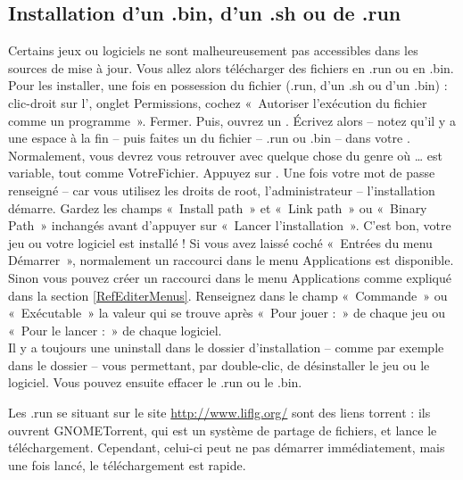 \subsection{Installation d'un .bin, d'un .sh ou de .run}
Certains jeux ou logiciels ne sont malheureusement pas accessibles dans les sources de mise à jour. Vous allez alors télécharger des fichiers en .run ou en .bin. Pour les installer, une fois en possession du fichier (.run, d'un .sh ou d'un .bin) : clic-droit sur l', onglet Permissions, cochez  «~Autoriser l'exécution du fichier comme un programme~». Fermer. Puis, ouvrez un . Écrivez alors  -- notez qu'il y a une espace à la fin -- puis faites un  du fichier -- .run ou .bin -- dans votre . Normalement, vous devrez vous retrouver avec quelque chose du genre  où \ldots{} est variable, tout comme VotreFichier. Appuyez sur . Une fois votre mot de passe renseigné -- car vous utilisez les droits de root, l'administrateur -- l'installation démarre. Gardez les champs «~Install path~» et «~Link path~» ou «~Binary Path~» inchangés avant d'appuyer sur «~Lancer l'installation~». C'est bon, votre jeu ou votre logiciel est installé ! Si vous avez laissé coché «~Entrées du menu Démarrer~», normalement un raccourci dans le menu Applications est disponible. Sinon vous pouvez créer un raccourci dans le menu Applications comme expliqué dans la section \ref{RefEditerMenus}. Renseignez dans le champ «~Commande~» ou «~Exécutable~» la valeur qui se trouve après «~Pour jouer :~» de chaque jeu ou «~Pour le lancer :~» de chaque logiciel.\\
Il y a toujours une  uninstall dans le dossier d'installation -- comme par exemple dans le dossier  -- vous permettant, par double-clic, de désinstaller le jeu ou le logiciel. Vous pouvez ensuite effacer le .run ou le .bin.\par
\begin{nota}
Les .run se situant sur le site \url{http://www.liflg.org/} sont des liens torrent : ils ouvrent GNOMETorrent, qui est un système de partage de fichiers, et lance le téléchargement. Cependant, celui-ci peut ne pas démarrer immédiatement, mais une fois lancé, le téléchargement est rapide.
\end{nota}
